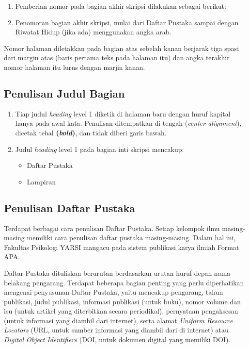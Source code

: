 \documentclass[
  indonesian,
  letterpaper,
]{scrbook}
\providecommand{\tightlist}{%
  \setlength{\itemsep}{0pt}\setlength{\parskip}{0pt}}
\begin{document}
\begin{enumerate}
\def\labelenumi{\alph{enumi}.}
\tightlist
\item
  Pemberian nomor pada bagian akhir skripsi dilakukan sebagai berikut:
\item
  Penomoran bagian akhir skripsi, mulai dari Daftar Pustaka sampai
  dengan Riwatat Hidup (jika ada) menggunakan angka arab.
\end{enumerate}

Nomor halaman diletakkan pada bagian atas sebelah kanan berjarak tiga
spasi dari margin atas (baris pertama teks pada halaman itu) dan angka
terakhir nomor halaman itu lurus dengan marjin kanan.

\subsection{Penulisan Judul Bagian}\label{penulisan-judul-bagian-1}

\begin{enumerate}
\def\labelenumi{\arabic{enumi}.}
\tightlist
\item
  Tiap judul \emph{heading} level 1 diketik di halaman baru dengan huruf
  kapital hanya pada awal kata. Penulisan ditempatkan di tengah
  (\emph{center alignment}), dicetak tebal \textbf{(\emph{bold})}, dan
  tidak diberi garis bawah.
\item
  Judul \emph{heading} level 1 pada bagian inti skripsi mencakup:

  \begin{itemize}
  \tightlist
  \item
    Daftar Pustaka
  \item
    Lampiran
  \end{itemize}
\end{enumerate}

\subsection{Penulisan Daftar Pustaka}\label{penulisan-daftar-pustaka}

Terdapat berbagai cara penulisan Daftar Pustaka. Setiap kelompok ilmu
masing-masing memiliki cara penulisan daftar pustaka masing-masing.
Dalam hal ini, Fakultas Psikologi YARSI mangacu pada sistem publikasi
karya ilmiah Format APA.

Daftar Pustaka dituliskan berurutan berdasarkan urutan huruf depan nama
belakang pengarang. Terdapat beberapa bagian penting yang perlu
diperhatikan mengenai penyusunan Daftar Pustaka, yaitu mencakup
pengarang, tahun publikasi, judul publikasi, informasi publikasi (untuk
buku), nomor volume dan isu (untuk artikel yang diterbitkan secara
periodikal), pernyataan pengaksesan (untuk informasi yang diambil dari
internet), serta alamat \emph{Uniform Resource Locators} (URL, untuk
sumber informasi yang diambil dari di internet) atau \emph{Digital
Object Identifiers} (DOI, untuk dokumen digital yang memiliki DOI).
\end{document}
